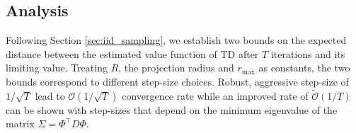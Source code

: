 \documentclass{colt2018} %
\begin{document}
\subsection{Analysis}
\label{sec:mc_analysis}
Following Section \ref{sec:iid_sampling}, we establish two bounds on the expected distance between the estimated value function of TD after $T$ iterations and its limiting value. Treating $R$, the projection radius and $r_{\max}$ as constants, the two bounds correspond to different step-size choices. Robust, aggressive step-size of $1/\sqrt{T}$ lead to $\mathcal{O}(1/\sqrt{T})$ convergence rate while an improved rate of $\tilde{\mathcal{O}}(1/T)$ can be shown with step-sizes that depend on the minimum eigenvalue of the matrix $\Sigma = \Phi^\top D \Phi$. 
\end{document}
